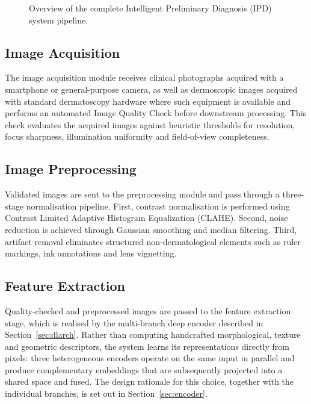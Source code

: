 \documentclass[pdflatex,sn-mathphys-num]{sn-jnl}%
\begin{document}
\begin{figure}[!t]
{%
}
\caption{Overview of the complete Intelligent Preliminary Diagnosis (IPD) system pipeline.}
\label{fig:pipeline}
\end{figure}

\subsection{Image Acquisition}

The image acquisition module receives clinical photographs acquired with a smartphone or
general-purpose camera, as well as dermoscopic images acquired with standard dermatoscopy
hardware where such equipment is available \cite{ref23} and performs an automated Image
Quality Check before downstream processing. This check evaluates the acquired images against
heuristic thresholds for resolution, focus sharpness, illumination uniformity and
field-of-view completeness.

\subsection{Image Preprocessing}

Validated images are sent to the preprocessing module and pass through a three-stage
normalisation pipeline. First, contrast normalisation is performed using Contrast Limited
Adaptive Histogram Equalization (CLAHE). Second, noise reduction is achieved through
Gaussian smoothing and median filtering. Third, artifact removal eliminates structured
non-dermatological elements such as ruler markings, ink annotations and lens vignetting.

\subsection{Feature Extraction}

Quality-checked and preprocessed images are passed to the feature extraction stage, which is
realised by the multi-branch deep encoder described in Section~\ref{sec:dlarch}. Rather than
computing handcrafted morphological, texture and geometric descriptors, the system learns its
representations directly from pixels: three heterogeneous encoders operate on the same input
in parallel and produce complementary embeddings that are subsequently projected into a
shared space and fused. The design rationale for this choice, together with the individual
branches, is set out in Section~\ref{sec:encoder}.
\end{document}
